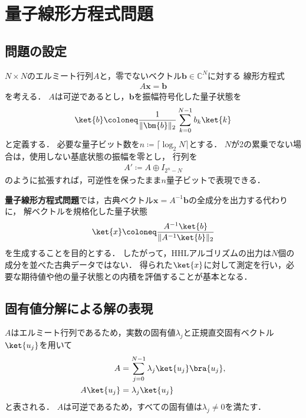 \section{量子線形方程式問題}
\label{sec:quantum-linear-system-problem}

\subsection{問題の設定}
\label{subsec:qlsp-formulation}

$N\times N$のエルミート行列$A$と，零でないベクトル$\bm{b}\in\mathbb{C}^{N}$に対する
線形方程式
\begin{align*}
  A\bm{x}=\bm{b}
\end{align*}
を考える．
$A$は可逆であるとし，$\bm{b}$を振幅符号化した量子状態を
\begin{equation}
  \ket{b}
  \coloneq
  \frac{1}{\|\bm{b}\|_2}
  \sum_{k=0}^{N-1}b_k\ket{k}
  \label{eq:qlsp-input-state}
\end{equation}
と定義する．
必要な量子ビット数を$n\coloneq\lceil\log_2N\rceil$とする．
$N$が2の累乗でない場合は，使用しない基底状態の振幅を零とし，
行列を
\begin{align*}
  A'
  \coloneq
  A\oplus I_{2^n-N}
\end{align*}
のように拡張すれば，可逆性を保ったまま$n$量子ビットで表現できる．

\textbf{量子線形方程式問題}では，古典ベクトル$\bm{x}=A^{-1}\bm{b}$の全成分を出力する代わりに，
解ベクトルを規格化した量子状態
\begin{equation}
  \ket{x}
  \coloneq
  \frac{A^{-1}\ket{b}}
       {\|A^{-1}\ket{b}\|_2}
  \label{eq:qlsp-solution-state}
\end{equation}
を生成することを目的とする\cite{hhl2009}．
したがって，HHLアルゴリズムの出力は$N$個の成分を並べた古典データではない．
得られた$\ket{x}$に対して測定を行い，必要な期待値や他の量子状態との内積を評価することが基本となる．

\subsection{固有値分解による解の表現}
\label{subsec:eigendecomposition-of-solution}

$A$はエルミート行列であるため，実数の固有値$\lambda_j$と正規直交固有ベクトル$\ket{u_j}$を用いて
\begin{align}
  A
  &=
  \sum_{j=0}^{N-1}\lambda_j\ket{u_j}\bra{u_j},
  \label{eq:a-spectral-decomposition}\\
  A\ket{u_j}
  &=
  \lambda_j\ket{u_j}
  \label{eq:a-eigenvalue-equation}
\end{align}
と表される．
$A$は可逆であるため，すべての固有値は$\lambda_j\neq0$を満たす．


